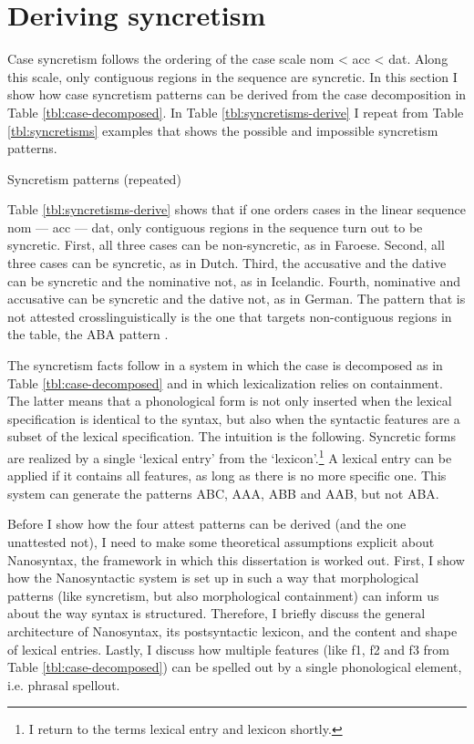 \section{Deriving syncretism}\label{sec:syncretism}

Case syncretism follows the ordering of the case scale \ac{nom} < \ac{acc} < \ac{dat}. Along this scale, only contiguous regions in the sequence are syncretic. In this section I show how case syncretism patterns can be derived from the case decomposition in Table \ref{tbl:case-decomposed}.
In Table \ref{tbl:syncretisms-derive} I repeat from Table \ref{tbl:syncretisms} examples that shows the possible and impossible syncretism patterns.

\begin{table}[H]
  \center
  \caption {Syncretism patterns (repeated)}
    
  \label{tbl:syncretisms-derive}
\end{table}


Table \ref{tbl:syncretisms-derive} shows that if one orders cases in the linear sequence \ac{nom} --- \ac{acc} --- \ac{dat}, only contiguous regions in the sequence turn out to be syncretic. First, all three cases can be non-syncretic, as in Faroese. Second, all three cases can be syncretic, as in Dutch. Third, the accusative and the dative can be syncretic and the nominative not, as in Icelandic. Fourth, nominative and accusative can be syncretic and the dative not, as in German. The pattern that is not attested crosslinguistically is the one that targets non-contiguous regions in the table, the ABA pattern \citep{baerman2005,caha2009,zompi2017}.

The syncretism facts follow in a system in which the case is decomposed as in Table \ref{tbl:case-decomposed} and in which lexicalization relies on containment. The latter means that a phonological form is not only inserted when the lexical specification is identical to the syntax, but also when the syntactic features are a subset of the lexical specification. The intuition is the following. Syncretic forms are realized by a single `lexical entry' from the `lexicon'.\footnote{
I return to the terms lexical entry and lexicon shortly.
} A lexical entry can be applied if it contains all features, as long as there is no more specific one. This system can generate the patterns ABC, AAA, ABB and AAB, but not ABA.

Before I show how the four attest patterns can be derived (and the one unattested not), I need to make some theoretical assumptions explicit about Nanosyntax, the framework in which this dissertation is worked out. First, I show how the Nanosyntactic system is set up in such a way that morphological patterns (like syncretism, but also morphological containment) can inform us about the way syntax is structured. Therefore, I briefly discuss the general architecture of Nanosyntax, its postsyntactic lexicon, and the content and shape of lexical entries. Lastly, I discuss how multiple features (like \ac{f}1, \ac{f}2 and \ac{f}3 from Table \ref{tbl:case-decomposed}) can be spelled out by a single phonological element, i.e. phrasal spellout.

